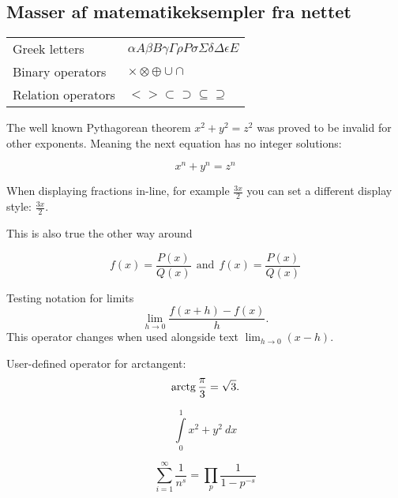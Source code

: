 \subsection{Masser af matematikeksempler fra nettet}
\begin{center}
\begin{tabular}{ l l }
  Greek letters & $\alpha A \beta B \gamma \Gamma \rho P \sigma \Sigma \delta \Delta \epsilon E$\\ 
  Binary operators & $\times \otimes \oplus \cup \cap$\\  
  Relation operators & $< > \subset \supset \subseteq \supseteq$ \\  
\end{tabular}
\end{center}


The well known Pythagorean theorem \(x^2 + y^2 = z^2\) was 
proved to be invalid for other exponents. 
Meaning the next equation has no integer solutions:

\[ x^n + y^n = z^n \]

When displaying fractions in-line, for example \(\frac{3x}{2}\) 
you can set a different display style: 
\( \displaystyle \frac{3x}{2} \).

This is also true the other way around

\[ f(x)=\frac{P(x)}{Q(x)} \ \ \textrm{and} 
\ \ f(x)=\textstyle\frac{P(x)}{Q(x)} \]

Testing notation for limits
\[
    \lim_{h \to 0 } \frac{f(x+h)-f(x)}{h}
.\]
This operator changes when used alongside 
text \( \lim_{h \to 0} (x-h) \).

User-defined operator for arctangent:
\[
    \operatorname{arctg} \frac{\pi}{3} = \sqrt{3}
.\]

\[ \int\limits_0^1 x^2 + y^2 \ dx \]

\[ \sum_{i=1}^{\infty} \frac{1}{n^s} 
= \prod_p \frac{1}{1 - p^{-s}} \]